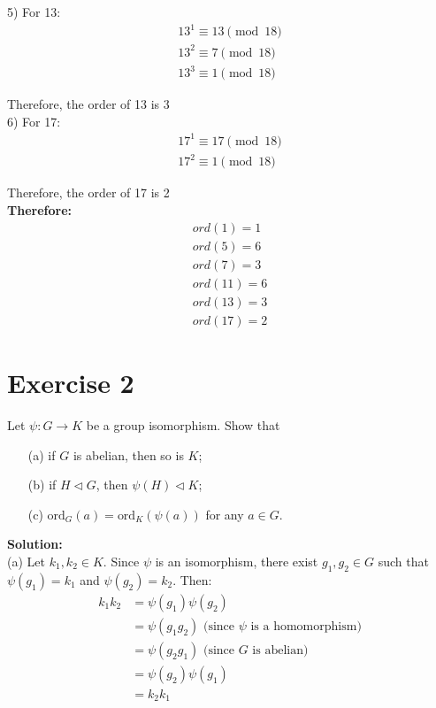 \documentclass{article}
\begin{document}
5) For 13:
\begin{align*}
   13^1 \equiv 13 \pmod{18} \\
   13^2 \equiv 7 \pmod{18} \\
   13^3 \equiv 1 \pmod{18}
\end{align*}

Therefore, the order of 13 is 3 \\

6) For 17:
\begin{align*}
   17^1 \equiv 17 \pmod{18} \\
   17^2 \equiv 1 \pmod{18}
\end{align*}

Therefore, the order of 17 is 2 \\

\textbf{Therefore:}
\begin{align*}
    ord(1) = 1 \\
    ord(5) = 6 \\
    ord(7) = 3 \\
    ord(11) = 6 \\
    ord(13) = 3 \\
    ord(17) = 2
\end{align*}

\newpage

\section*{Exercise 2}
Let $\psi: G \to K$ be a group isomorphism. Show that
\begin{itemize}
\item[(a)] if $G$ is abelian, then so is $K$;
\item[(b)] if $H \triangleleft G$, then $\psi(H) \triangleleft K$;
\item[(c)] $\text{ord}_G(a) = \text{ord}_K(\psi(a))$ for any $a \in G$.
\end{itemize}

\textbf{Solution:} \\

(a) Let $k_1, k_2 \in K$. Since $\psi$ is an isomorphism, there exist $g_1, g_2 \in G$ such that $\psi(g_1) = k_1$ and $\psi(g_2) = k_2$.
Then:
\begin{align*}
k_1k_2 &= \psi(g_1)\psi(g_2) \\
&= \psi(g_1g_2) \text{ (since $\psi$ is a homomorphism)} \\
&= \psi(g_2g_1) \text{ (since $G$ is abelian)} \\
&= \psi(g_2)\psi(g_1) \\
&= k_2k_1
\end{align*}
\end{document}
